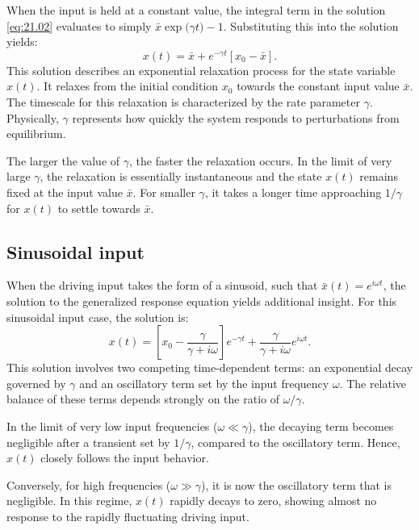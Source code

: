 When the input is held at a constant value, the integral term in the solution \eqref{eq:21.02} evaluates to simply $\bar{x}\exp({\gamma t) - 1}$. Substituting this into the solution yields:
\begin{equation*}
x(t) = \bar{x} + e^{-\gamma t} \left[x_0 - \bar{x} \right].
\end{equation*}
This solution describes an exponential relaxation process for the state variable $x(t)$. It relaxes from the initial condition $x_0$ towards the constant input value $\bar{x}$. The timescale for this relaxation is characterized by the rate parameter $\gamma$. Physically, $\gamma$ represents how quickly the system responds to perturbations from equilibrium.

The larger the value of $\gamma$, the faster the relaxation occurs. In the limit of very large $\gamma$, the relaxation is essentially instantaneous and the state $x(t)$ remains fixed at the input value $\bar{x}$. For smaller $\gamma$, it takes a longer time approaching $1/\gamma$ for $x(t)$ to settle towards $\bar{x}$.

\subsection{Sinusoidal input}

When the driving input takes the form of a sinusoid, such that $\bar{x}(t) = e^{i\omega t}$, the solution to the generalized response equation yields additional insight. For this sinusoidal input case, the solution is:
\begin{equation*}
x(t) = \left[x_0 - \frac{\gamma}{\gamma + i\omega}\right]e^{-\gamma t} + \frac{\gamma}{\gamma + i\omega}e^{i\omega t}.
\end{equation*}
This solution involves two competing time-dependent terms: an exponential decay governed by $\gamma$ and an oscillatory term set by the input frequency $\omega$. The relative balance of these terms depends strongly on the ratio of $\omega/\gamma$.

In the limit of very low input frequencies ($\omega \ll \gamma$), the decaying term becomes negligible after a transient set by $1/\gamma$, compared to the oscillatory term. Hence, $x(t)$ closely follows the input behavior.

Conversely, for high frequencies ($\omega \gg \gamma$), it is now the oscillatory term that is negligible. In this regime, $x(t)$ rapidly decays to zero, showing almost no response to the rapidly fluctuating driving input.

